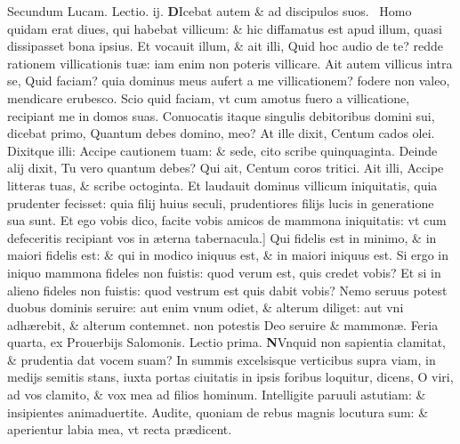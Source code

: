 \documentclass[a5paper,10pt]{book}
\def\leftmarginnote{%
	\lrmarginnote{\hskip -\marginparsep \hskip -6.5em}}
\def\rightmarginnote{%
	\lrmarginnote{\hskip\columnwidth \hskip -1em}}
\def\ae{æ}
\begin{document}
\begin{multicols*}{2}
\newline \color{red} Secundum Lucam. \hfill Lectio. ij. \color{black}
\vspace{-.25em}
\lettrine[lines=2]{\bfseries \color{red} D}{}Icebat\leftmarginnote{\begin{flushright}c. 16.\\a\end{flushright}} autem \& ad discipulos suos. \textdagger \ 
Homo quidam erat diues, qui habebat villicum: \& hic diffamatus est apud illum, quasi dissipasset bona ipsius.
Et vocauit illum, \& ait illi, Quid hoc audio de te? redde rationem villicationis tu\ae : iam enim non poteris villicare.
Ait autem villicus intra se, Quid faciam? quia dominus meus aufert a me villicationem? fodere non valeo, mendicare erubesco.
Scio quid faciam, vt cum amotus fuero a villicatione, recipiant me in domos suas.
Conuocatis itaque singulis debitoribus domini sui, dicebat primo, Quantum debes domino, meo?
At ille dixit, Centum cados olei. Dixitque illi: Accipe cautionem tuam: \& sede, cito scribe quinquaginta.
Deinde alij dixit, Tu vero quantum debes? Qui ait, Centum coros tritici.
Ait illi, Accipe litteras tuas, \& scribe octoginta. Et laudauit dominus villicum iniquitatis, quia prudenter fecisset: quia filij huius seculi, prudentiores filijs lucis in generatione sua sunt.
Et ego vobis dico, facite vobis amicos de mammona iniquitatis: vt cum defeceritis recipiant vos in \ae terna tabernacula.]
Qui\rightmarginnote{B} fidelis est in minimo, \& in maiori fidelis est: \& qui in modico iniquus est, \& in maiori iniquus est.
Si ergo in iniquo mammona fideles non fuistis: quod verum est, quis credet vobis? Et si in alieno fideles
non fuistis: quod vestrum est quis dabit vobis? Nemo seruus potest duobus dominis seruire: aut enim vnum odiet, \& alterum diliget: aut vni adh\ae rebit, \& alterum contemnet. non potestis Deo seruire \& mammon\ae .
\newline \textswab{C} \color{red} \hypertarget{WED-SECVNDA-POST-ADV}{Feria quarta,} ex Prouerbijs Salomonis. \hfill Lectio prima. \color{black}
\bookmark[dest=WED-SECVNDA-POST-ADV]{FERIA QVARTA}
\vspace{-2.25em}
\lettrine[lines=2]{\bfseries N}{}Vnquid\rightmarginnote{ca. 8.} non sapientia clamitat, \& prudentia dat vocem suam?
In summis excelsisque verticibus supra viam, in medijs semitis stans, iuxta portas ciuitatis in ipsis foribus loquitur, dicens, O viri, ad vos clamito, \& vox mea ad filios hominum.
Intelligite paruuli astutiam: \& insipientes animaduertite.
Audite, quoniam de rebus magnis locutura sum: \& aperientur labia mea, vt recta pr\ae dicent.

\end{multicols*}
\end{document}
